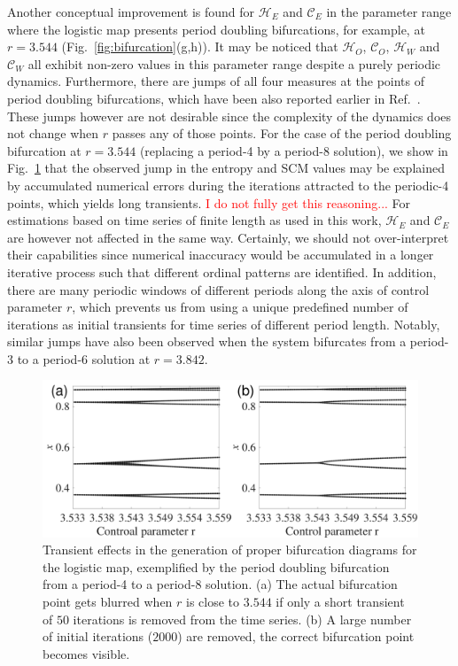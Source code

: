 \documentclass[12pt,aip,cha,reprint,nofootinbib]{revtex4-1}
\begin{document}
Another conceptual improvement is found for $\mathcal{H}_E$ and $\mathcal{C}_E$ in the parameter range where the logistic map presents period doubling bifurcations, for example, at $r = 3.544$ (Fig.~\ref{fig:bifurcation}(g,h)). It may be noticed that $\mathcal{H}_O$, $\mathcal{C}_O$, $\mathcal{H}_W$ and $\mathcal{C}_W$ all exhibit non-zero values in this parameter range despite a purely periodic dynamics. Furthermore, there are jumps of all four measures at the points of period doubling bifurcations, which have been also reported earlier in Ref.~\cite{BandtPRL2002}. These jumps however are not desirable since the complexity of the dynamics does not change when $r$ passes any of those points. For the case of the period doubling bifurcation at $r=3.544$ (replacing a period-4 by a period-8 solution), we show in Fig.~\ref{fig:transient} that the observed jump in the entropy and SCM values may be explained by accumulated numerical errors during the iterations attracted to the periodic-4 points, which yields long transients. \textcolor{red}{I do not fully get this reasoning...} For estimations based on time series of finite length as used in this work, $\mathcal{H}_E$ and $\mathcal{C}_E$ are however not affected in the same way. Certainly, we should not over-interpret their capabilities since numerical inaccuracy would be accumulated in a longer iterative process such that different ordinal patterns are identified. In addition, there are many periodic windows of different periods along the axis of control parameter $r$, which prevents us from using a unique predefined number of iterations as initial transients for time series of different period length. Notably, similar jumps have also been observed when the system bifurcates from a period-3 to a period-6 solution at $r = 3.842$. 

\begin{figure}
	\centering
	\includegraphics[width=\columnwidth]{period4_exampleTransients.pdf}
\caption{\small{Transient effects in the generation of proper bifurcation diagrams for the logistic map, exemplified by the period doubling bifurcation from a period-4 to a period-8 solution. (a) The actual bifurcation point gets blurred when $r$ is close to $3.544$ if only a short transient of $50$ iterations is removed from the time series. (b) A large number of initial iterations ($2000$) are removed, the correct bifurcation point becomes visible. }\label{fig:transient}}
\end{figure}
\end{document}
